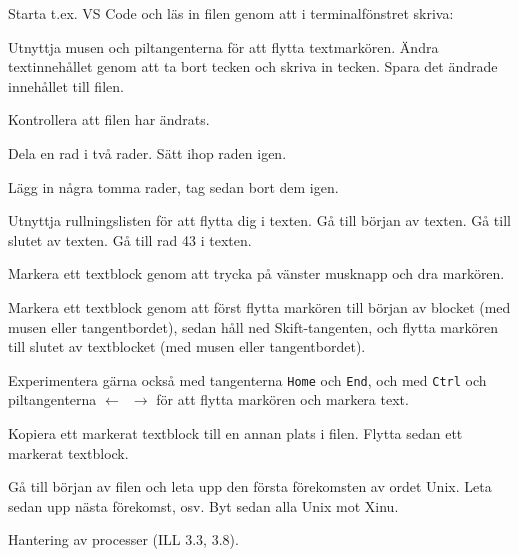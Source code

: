 \begin{Datorarbete}
	\begin{Deluppgifter}
		\item Starta t.ex. VS Code och läs in filen  genom att i terminalfönstret skriva:\\
		\item Utnyttja musen och piltangenterna för att flytta textmarkören. Ändra textinnehållet genom att ta bort tecken och skriva in tecken. Spara det ändrade innehållet till filen.
		\item Kontrollera att filen  har ändrats.
		\item Dela en rad i två rader. Sätt ihop raden igen.
		\item Lägg in några tomma rader, tag sedan bort dem igen.
		\item Utnyttja rullningslisten för att flytta dig i texten. Gå till början av texten. Gå till slutet av texten. Gå till rad 43 i texten.
		\item Markera ett textblock genom att trycka på vänster musknapp och dra markören.
		\item Markera ett textblock genom att först flytta markören till början av blocket (med musen eller tangentbordet), sedan håll ned Skift-tangenten, och flytta markören till slutet av textblocket (med musen eller tangentbordet).
		\item Experimentera gärna också med tangenterna \texttt{Home} och \texttt{End}, och med \texttt{Ctrl} och piltangenterna \texttt{$\leftarrow$ $\rightarrow$} för att flytta markören och markera text.
		\item Kopiera ett markerat textblock till en annan plats i filen. Flytta sedan ett markerat textblock.
		\item Gå till början av filen och leta upp den första förekomsten av ordet Unix. Leta sedan upp nästa förekomst, osv. Byt sedan alla Unix mot Xinu.
	\end{Deluppgifter}

	\item Hantering av processer (ILL 3.3, 3.8).


\end{Datorarbete}
